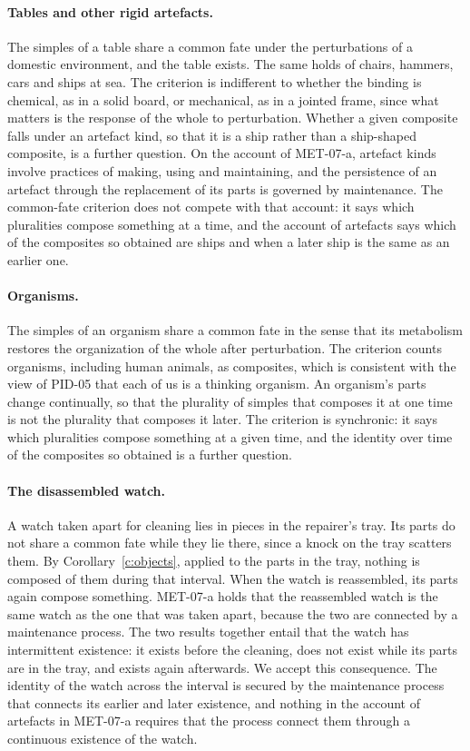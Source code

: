 \documentclass{situationist-preprint}
\begin{document}
\paragraph{Tables and other rigid artefacts.} The simples of a table share a common fate under the perturbations of a domestic environment, and the table exists. The same holds of chairs, hammers, cars and ships at sea. The criterion is indifferent to whether the binding is chemical, as in a solid board, or mechanical, as in a jointed frame, since what matters is the response of the whole to perturbation. Whether a given composite falls under an artefact kind, so that it is a ship rather than a ship-shaped composite, is a further question. On the account of MET-07-a, artefact kinds involve practices of making, using and maintaining, and the persistence of an artefact through the replacement of its parts is governed by maintenance. The common-fate criterion does not compete with that account: it says which pluralities compose something at a time, and the account of artefacts says which of the composites so obtained are ships and when a later ship is the same as an earlier one.

\paragraph{Organisms.} The simples of an organism share a common fate in the sense that its metabolism restores the organization of the whole after perturbation. The criterion counts organisms, including human animals, as composites, which is consistent with the view of PID-05 that each of us is a thinking organism. An organism's parts change continually, so that the plurality of simples that composes it at one time is not the plurality that composes it later. The criterion is synchronic: it says which pluralities compose something at a given time, and the identity over time of the composites so obtained is a further question.

\paragraph{The disassembled watch.} A watch taken apart for cleaning lies in pieces in the repairer's tray. Its parts do not share a common fate while they lie there, since a knock on the tray scatters them. By Corollary~\ref{c:objects}, applied to the parts in the tray, nothing is composed of them during that interval. When the watch is reassembled, its parts again compose something. MET-07-a holds that the reassembled watch is the same watch as the one that was taken apart, because the two are connected by a maintenance process. The two results together entail that the watch has intermittent existence: it exists before the cleaning, does not exist while its parts are in the tray, and exists again afterwards. We accept this consequence. The identity of the watch across the interval is secured by the maintenance process that connects its earlier and later existence, and nothing in the account of artefacts in MET-07-a requires that the process connect them through a continuous existence of the watch.
\end{document}
